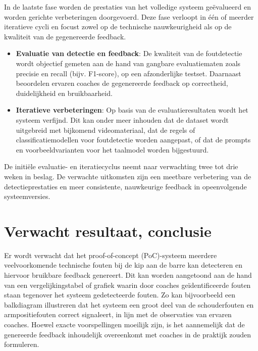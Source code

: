 In de laatste fase worden de prestaties van het volledige systeem geëvalueerd en worden gerichte verbeteringen doorgevoerd. Deze fase verloopt in één of meerder iteratieve cycli en focust zowel op de technische nauwkeurigheid als op de kwaliteit van de gegenereerde feedback.

\begin{itemize}
    \item \textbf{Evaluatie van detectie en feedback}: De kwaliteit van de foutdetectie wordt objectief gemeten aan de hand van gangbare evaluatiematen zoals precisie en recall (bijv. F1-score), op een afzonderlijke testset. Daarnaast beoordelen ervaren coaches de gegenereerde feedback op correctheid, duidelijkheid en bruikbaarheid.
    \item \textbf{Iteratieve verbeteringen}: Op basis van de evaluatieresultaten wordt het systeem verfijnd. Dit kan onder meer inhouden dat de dataset wordt uitgebreid met bijkomend videomateriaal, dat de regels of classificatiemodellen voor foutdetectie worden aangepast, of dat de prompts en voorbeeldvarianten voor het taalmodel worden bijgestuurd.
\end{itemize}

De initiële evaluatie- en iteratiecyclus neemt naar verwachting twee tot drie weken in beslag. De verwachte uitkomsten zijn een meetbare verbetering van de detectieprestaties en meer consistente, nauwkeurige feedback in opeenvolgende systeemversies.


\section{Verwacht resultaat, conclusie}%
\label{sec:verwachte_resultaten}

Er wordt verwacht dat het proof-of-concept (PoC)-systeem meerdere veelvoorkomende technische fouten bij de kip aan de barre kan detecteren en hiervoor bruikbare feedback genereert. Dit kan worden aangetoond aan de hand van een vergelijkingstabel of grafiek waarin door coaches geïdentificeerde fouten staan tegenover het systeem gedetecteerde fouten. Zo kan bijvoorbeeld een balkdiagram illustreren dat het systeem een groot deel van de schouderfouten en armpositiefouten correct signaleert, in lijn met de observaties van ervaren coaches. Hoewel exacte voorspellingen moeilijk zijn, is het aannemelijk dat de genereerde feedback inhoudelijk overeenkomt met coaches in de praktijk zouden formuleren.

